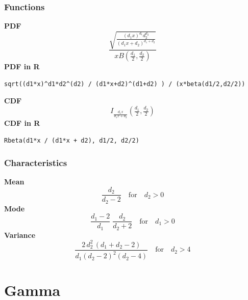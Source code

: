 \subsubsection*{Functions}

\smallskip \noindent \hspace{.2cm} \textbf{PDF} 
\begin{equation*}\frac{\sqrt{\frac{(d_1 x)^{d_1}d_2^{d_2}}
{(d_1 x+d_2)^{d_1+d_2}}}}
{x B\left(\frac{d_1}{2},\frac{d_2}{2}\right)}\end{equation*}
\smallskip \noindent \hspace{.2cm} \textbf{PDF in R}  
\begin{verbatim}sqrt((d1*x)^d1*d2^(d2) / (d1*x+d2)^(d1+d2) ) / (x*beta(d1/2,d2/2))\end{verbatim}
\smallskip \noindent \hspace{.2cm} \textbf{CDF} 
\begin{equation*}I_{\frac{d_1 x}{d_1 x + d_2}} \left(\tfrac{d_1}{2}, \tfrac{d_2}{2} \right)\end{equation*}
\smallskip \noindent \hspace{.2cm} \textbf{CDF in R} 
\begin{verbatim}Rbeta(d1*x / (d1*x + d2), d1/2, d2/2)\end{verbatim}
\smallskip
\subsubsection*{Characteristics}
\smallskip \noindent \hspace{.2cm} \textbf{Mean} 
\begin{equation*}\frac{d_2}{d_2-2} \quad \text{for} \quad d_2 > 0\end{equation*}
\smallskip \noindent \hspace{.2cm} \textbf{Mode} 
\begin{equation*}\frac{d_1-2}{d_1}\;\frac{d_2}{d_2+2} \quad \text{for} \quad d_1 > 0\end{equation*}
\smallskip \noindent \hspace{.2cm} \textbf{Variance} 
\begin{equation*}\frac{2\,d_2^2\,(d_1+d_2-2)}{d_1 (d_2-2)^2 (d_2-4)} \quad \text{for} \quad d_2 > 4\end{equation*}
\smallskip
\section*{Gamma} 

  \bigskip 

